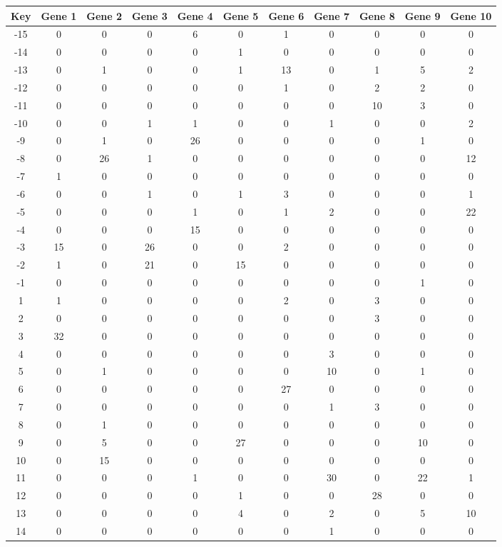 \begin{tabular}{|c|c|c|c|c|c|c|c|c|c|c|}
\hline
Key & Gene 1 & Gene 2 & Gene 3 & Gene 4 & Gene 5 & Gene 6 & Gene 7 & Gene 8 & Gene 9 & Gene 10 \\
\hline
-15 & 0 & 0 & 0 & 6 & 0 & 1 & 0 & 0 & 0 & 0 \\
-14 & 0 & 0 & 0 & 0 & 1 & 0 & 0 & 0 & 0 & 0 \\
-13 & 0 & 1 & 0 & 0 & 1 & 13 & 0 & 1 & 5 & 2 \\
-12 & 0 & 0 & 0 & 0 & 0 & 1 & 0 & 2 & 2 & 0 \\
-11 & 0 & 0 & 0 & 0 & 0 & 0 & 0 & 10 & 3 & 0 \\
-10 & 0 & 0 & 1 & 1 & 0 & 0 & 1 & 0 & 0 & 2 \\
-9 & 0 & 1 & 0 & 26 & 0 & 0 & 0 & 0 & 1 & 0 \\
-8 & 0 & 26 & 1 & 0 & 0 & 0 & 0 & 0 & 0 & 12 \\
-7 & 1 & 0 & 0 & 0 & 0 & 0 & 0 & 0 & 0 & 0 \\
-6 & 0 & 0 & 1 & 0 & 1 & 3 & 0 & 0 & 0 & 1 \\
-5 & 0 & 0 & 0 & 1 & 0 & 1 & 2 & 0 & 0 & 22 \\
-4 & 0 & 0 & 0 & 15 & 0 & 0 & 0 & 0 & 0 & 0 \\
-3 & 15 & 0 & 26 & 0 & 0 & 2 & 0 & 0 & 0 & 0 \\
-2 & 1 & 0 & 21 & 0 & 15 & 0 & 0 & 0 & 0 & 0 \\
-1 & 0 & 0 & 0 & 0 & 0 & 0 & 0 & 0 & 1 & 0 \\
1 & 1 & 0 & 0 & 0 & 0 & 2 & 0 & 3 & 0 & 0 \\
2 & 0 & 0 & 0 & 0 & 0 & 0 & 0 & 3 & 0 & 0 \\
3 & 32 & 0 & 0 & 0 & 0 & 0 & 0 & 0 & 0 & 0 \\
4 & 0 & 0 & 0 & 0 & 0 & 0 & 3 & 0 & 0 & 0 \\
5 & 0 & 1 & 0 & 0 & 0 & 0 & 10 & 0 & 1 & 0 \\
6 & 0 & 0 & 0 & 0 & 0 & 27 & 0 & 0 & 0 & 0 \\
7 & 0 & 0 & 0 & 0 & 0 & 0 & 1 & 3 & 0 & 0 \\
8 & 0 & 1 & 0 & 0 & 0 & 0 & 0 & 0 & 0 & 0 \\
9 & 0 & 5 & 0 & 0 & 27 & 0 & 0 & 0 & 10 & 0 \\
10 & 0 & 15 & 0 & 0 & 0 & 0 & 0 & 0 & 0 & 0 \\
11 & 0 & 0 & 0 & 1 & 0 & 0 & 30 & 0 & 22 & 1 \\
12 & 0 & 0 & 0 & 0 & 1 & 0 & 0 & 28 & 0 & 0 \\
13 & 0 & 0 & 0 & 0 & 4 & 0 & 2 & 0 & 5 & 10 \\
14 & 0 & 0 & 0 & 0 & 0 & 0 & 1 & 0 & 0 & 0 \\
\hline
\end{tabular}